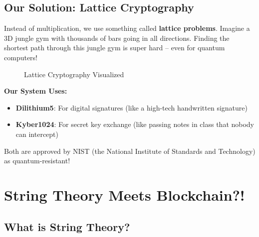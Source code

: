\documentclass[11pt,a4paper]{article}
\begin{document}
\subsection{Our Solution: Lattice Cryptography}

Instead of multiplication, we use something called \textbf{lattice problems}. Imagine a 3D jungle gym with thousands of bars going in all directions. Finding the shortest path through this jungle gym is super hard -- even for quantum computers!

\begin{figure}[H]
\centering
{}
\caption{Lattice Cryptography Visualized}
\end{figure}

\textbf{Our System Uses:}
\begin{itemize}
    \item \textbf{Dilithium5}: For digital signatures (like a high-tech handwritten signature)
    \item \textbf{Kyber1024}: For secret key exchange (like passing notes in class that nobody can intercept)
\end{itemize}

Both are approved by NIST (the National Institute of Standards and Technology) as quantum-resistant!

\section{String Theory Meets Blockchain?!}

\subsection{What is String Theory?}
\end{document}
